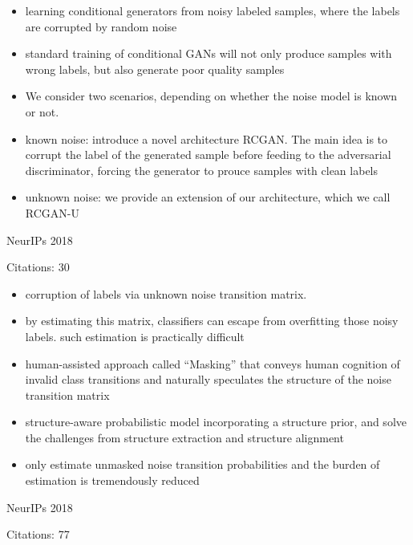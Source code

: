 \documentclass[11pt]{article}
\begin{document}
\begin{itemize}
  \item learning conditional generators from noisy labeled samples, where the labels are corrupted by random noise
  \item standard training of conditional GANs will not only produce samples with wrong labels, but also generate poor quality samples
  \item We consider two scenarios, depending on whether the noise model is known or not.
  \item known noise: introduce a novel architecture RCGAN. The main idea is to corrupt the label of the generated sample before feeding to the adversarial discriminator, forcing the generator to prouce samples with clean labels
  \item unknown noise: we provide an extension of our architecture, which we call RCGAN-U
\end{itemize}

\vspace{2cm}

\noindent NeurIPs 2018

\noindent Citations: 30

\begin{itemize}
  \item corruption of labels via unknown noise transition matrix.
  \item by estimating this matrix, classifiers can escape from overfitting those noisy labels. such estimation is practically difficult
  \item human-assisted approach called “Masking” that conveys human cognition of invalid class transitions and naturally speculates the structure of the noise transition matrix
  \item structure-aware probabilistic model incorporating a structure prior, and solve the challenges from structure extraction and structure alignment
  \item only estimate unmasked noise transition probabilities and the burden of estimation is tremendously reduced
\end{itemize}

\vspace{2cm}

\noindent NeurIPs 2018

\noindent Citations: 77
\end{document}
